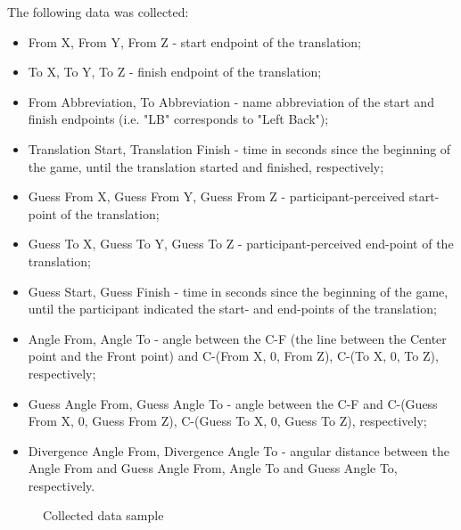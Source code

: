 The following data was collected:
\begin{itemize}
	\item From X, From Y, From Z - start endpoint of the translation;
	\item To X, To Y, To Z - finish endpoint of the translation;
	\item From Abbreviation, To Abbreviation - name abbreviation of the start and finish endpoints (i.e. "LB" corresponds to "Left Back");
	\item Translation Start, Translation Finish - time in seconds since the beginning of the game, until the translation started and finished, respectively;
	\item Guess From X, Guess From Y, Guess From Z - participant-perceived start-point of the translation;
	\item Guess To X, Guess To Y, Guess To Z - participant-perceived end-point of the translation;
	\item Guess Start, Guess Finish - time in seconds since the beginning of the game, until the participant indicated the start- and end-points of the translation;
	\item Angle From, Angle To - angle between the C-F (the line between the Center point and the Front point) and C-(From X, 0, From Z), C-(To X, 0, To Z), respectively;
	\item Guess Angle From, Guess Angle To - angle between the C-F and C-(Guess From X, 0, Guess From Z), C-(Guess To X, 0, Guess To Z), respectively;
	\item Divergence Angle From, Divergence Angle To - angular distance between the Angle From and Guess Angle From, Angle To and Guess Angle To, respectively.
\end{itemize}

\begin{figure}
	\centering
	\par
	\caption{Collected data sample}
	\label{fig:pilot2datasample}
\end{figure}



